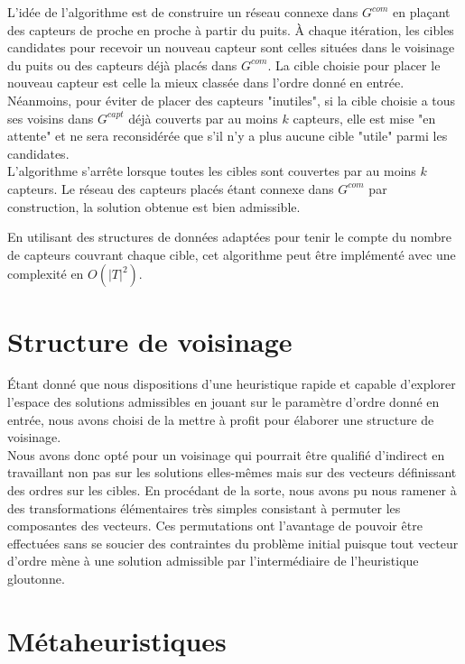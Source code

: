 \documentclass[12pt]{article}
\begin{document}
\bigskip

L'idée de l'algorithme est de construire un réseau connexe dans $G^{com}$ en plaçant des capteurs de proche en proche à partir du puits.
À chaque itération, les cibles candidates pour recevoir un nouveau capteur sont celles situées dans le voisinage du puits ou des capteurs déjà placés dans $G^{com}$.
La cible choisie pour placer le nouveau capteur est celle la mieux classée dans l'ordre donné en entrée.
Néanmoins, pour éviter de placer des capteurs "inutiles", si la cible choisie a tous ses voisins dans $G^{capt}$ déjà couverts par au moins $k$ capteurs, elle est mise "en attente" et ne sera reconsidérée que s'il n'y a plus aucune cible "utile" parmi les candidates.\\
L'algorithme s'arrête lorsque toutes les cibles sont couvertes par au moins $k$ capteurs.
Le réseau des capteurs placés étant connexe dans $G^{com}$ par construction, la solution obtenue est bien admissible.

\bigskip

En utilisant des structures de données adaptées pour tenir le compte du nombre de capteurs couvrant chaque cible, cet algorithme peut être implémenté avec une complexité en $O(|T|^2)$.



\section{Structure de voisinage}

Étant donné que nous dispositions d'une heuristique rapide et capable d'explorer l'espace des solutions admissibles en jouant sur le paramètre d'ordre donné en entrée, nous avons choisi de la mettre à profit pour élaborer une structure de voisinage.\\
Nous avons donc opté pour un voisinage qui pourrait être qualifié d'indirect en travaillant non pas sur les solutions elles-mêmes mais sur des vecteurs définissant des ordres sur les cibles.
En procédant de la sorte, nous avons pu nous ramener à des transformations élémentaires très simples consistant à permuter les composantes des vecteurs.
Ces permutations ont l'avantage de pouvoir être effectuées sans se soucier des contraintes du problème initial puisque tout vecteur d'ordre mène à une solution admissible par l'intermédiaire de l'heuristique gloutonne.



\section{Métaheuristiques}
\end{document}
